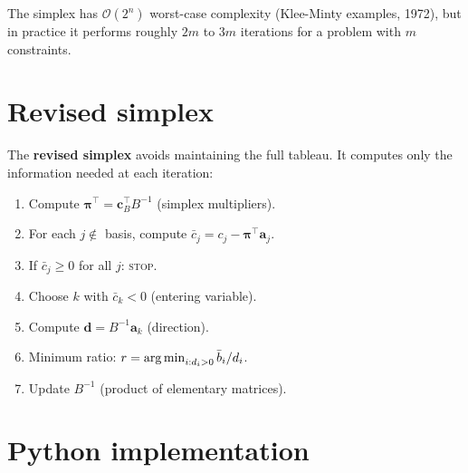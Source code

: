 \begin{remark}
The simplex has $\mathcal{O}(2^n)$ worst-case complexity (Klee-Minty
examples, 1972), but in practice it performs roughly $2m$ to $3m$ iterations
for a problem with $m$ constraints.
\end{remark}

\section{Revised simplex}

The \textbf{revised simplex} avoids maintaining the full tableau.  It
computes only the information needed at each iteration:

\begin{algorithme}[title=\textbf{Revised simplex --- one iteration}]
\begin{enumerate}
  \item Compute $\boldsymbol{\pi}^\top = \mathbf{c}_B^\top B^{-1}$
        (simplex multipliers).
  \item For each $j \notin$ basis, compute
        $\bar{c}_j = c_j - \boldsymbol{\pi}^\top \mathbf{a}_j$.
  \item If $\bar{c}_j \ge 0$ for all $j$: \textsc{stop}.
  \item Choose $k$ with $\bar{c}_k < 0$ (entering variable).
  \item Compute $\mathbf{d} = B^{-1}\mathbf{a}_k$ (direction).
  \item Minimum ratio: $r = \operatorname*{arg\,min}_{i : d_i > 0} \bar{b}_i / d_i$.
  \item Update $B^{-1}$ (product of elementary matrices).
\end{enumerate}
\end{algorithme}

\section{Python implementation}

